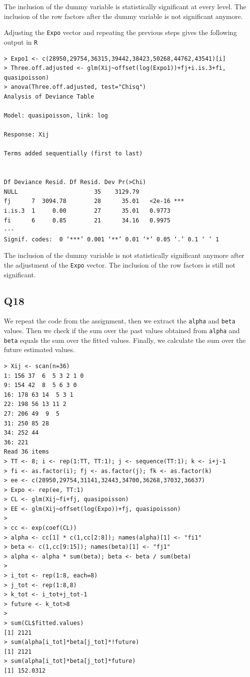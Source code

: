 \documentclass[11pt]{article}
\begin{document}
The inclusion of the dummy variable is statistically significant at every level. The inclusion of the row factors after the dummy variable is not significant anymore. 

Adjusting the \verb|Expo| vector and repeating the previous steps gives the following output in \verb|R|

\begin{verbatim}
> Expo1 <- c(28950,29754,36315,39442,38423,50268,44762,43541)[i]
> Three.off.adjusted <- glm(Xij~offset(log(Expo1))+fj+i.is.3+fi, quasipoisson)
> anova(Three.off.adjusted, test="Chisq")
Analysis of Deviance Table

Model: quasipoisson, link: log

Response: Xij

Terms added sequentially (first to last)


Df Deviance Resid. Df Resid. Dev Pr(>Chi)    
NULL                      35    3129.79             
fj      7  3094.78        28      35.01   <2e-16 ***
i.is.3  1     0.00        27      35.01   0.9773    
fi      6     0.85        21      34.16   0.9975    
---
Signif. codes:  0 ‘***’ 0.001 ‘**’ 0.01 ‘*’ 0.05 ‘.’ 0.1 ‘ ’ 1

\end{verbatim}
The inclusion of the dummy variable is not statistically significant anymore after the adjustment of the \verb|Expo| vector. The inclusion of the row factors is still not significant.


\subsection*{Q18}

We repeat the code from the assignment, then we extract the \verb|alpha| and \verb|beta| values. Then we check if the sum over the past values obtained from \verb|alpha| and \verb|beta| equals the sum over the fitted values. Finally, we calculate the sum over the future estimated values.

\begin{verbatim}
> Xij <- scan(n=36)
1: 156 37  6  5 3 2 1 0
9: 154 42  8  5 6 3 0
16: 178 63 14  5 3 1
22: 198 56 13 11 2
27: 206 49  9  5
31: 250 85 28
34: 252 44
36: 221
Read 36 items
> TT <- 8; i <- rep(1:TT, TT:1); j <- sequence(TT:1); k <- i+j-1
> fi <- as.factor(i); fj <- as.factor(j); fk <- as.factor(k)
> ee <- c(28950,29754,31141,32443,34700,36268,37032,36637)
> Expo <- rep(ee, TT:1)
> CL <- glm(Xij~fi+fj, quasipoisson)
> EE <- glm(Xij~offset(log(Expo))+fj, quasipoisson)
> 
> cc <- exp(coef(CL))
> alpha <- cc[1] * c(1,cc[2:8]); names(alpha)[1] <- "fi1"
> beta <- c(1,cc[9:15]); names(beta)[1] <- "fj1"
> alpha <- alpha * sum(beta); beta <- beta / sum(beta)
> 
> i_tot <- rep(1:8, each=8)
> j_tot <- rep(1:8,8)
> k_tot <- i_tot+j_tot-1
> future <- k_tot>8
> 
> sum(CL$fitted.values)
[1] 2121
> sum(alpha[i_tot]*beta[j_tot]*!future)
[1] 2121
> sum(alpha[i_tot]*beta[j_tot]*future)
[1] 152.0312
\end{verbatim}
\end{document}
